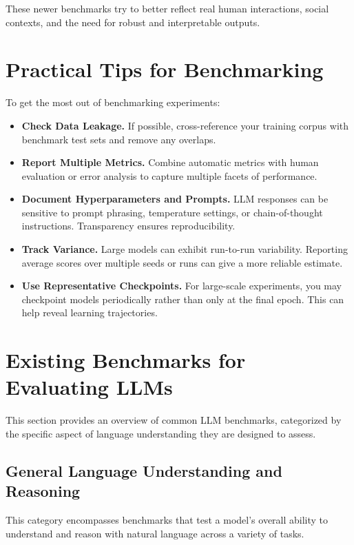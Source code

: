 \noindent
These newer benchmarks try to better reflect real human interactions, social contexts, and the need for robust and interpretable outputs.

\section{Practical Tips for Benchmarking}
\noindent
To get the most out of benchmarking experiments:
\begin{itemize}
    \item \textbf{Check Data Leakage.} If possible, cross-reference your training corpus with benchmark test sets and remove any overlaps.
    \item \textbf{Report Multiple Metrics.} Combine automatic metrics with human evaluation or error analysis to capture multiple facets of performance.
    \item \textbf{Document Hyperparameters and Prompts.} LLM responses can be sensitive to prompt phrasing, temperature settings, or chain-of-thought instructions. Transparency ensures reproducibility.
    \item \textbf{Track Variance.} Large models can exhibit run-to-run variability. Reporting average scores over multiple seeds or runs can give a more reliable estimate.
    \item \textbf{Use Representative Checkpoints.} For large-scale experiments, you may checkpoint models periodically rather than only at the final epoch. This can help reveal learning trajectories.
\end{itemize}


\section{Existing Benchmarks for Evaluating LLMs}

 This section provides an overview of common LLM benchmarks, categorized by the specific aspect of language understanding they are designed to assess.

\subsection{General Language Understanding and Reasoning}

This category encompasses benchmarks that test a model's overall ability to understand and reason with natural language across a variety of tasks.


